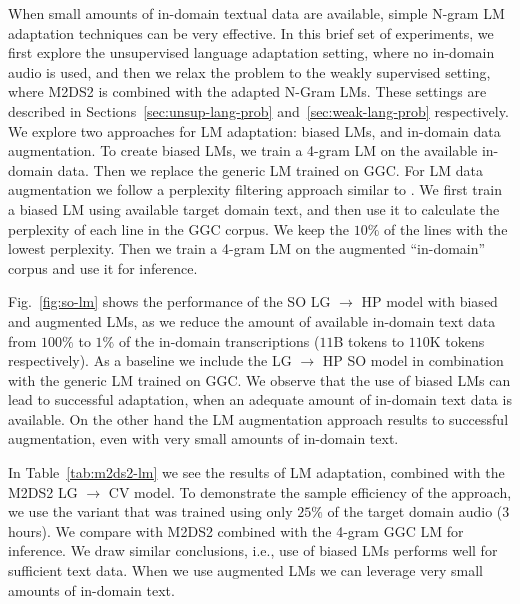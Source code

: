 \documentclass[journal]{IEEEtran}
\begin{document}
When small amounts of in-domain textual data are available, simple N-gram LM adaptation techniques can be very effective. In this brief set of experiments, we first explore the unsupervised language adaptation setting, where no in-domain audio is used, and then we relax the problem to the weakly supervised setting, where M2DS2 is combined with the adapted N-Gram LMs. These settings are described in Sections~\ref{sec:unsup-lang-prob} and~\ref{sec:weak-lang-prob} respectively.
We explore two approaches for LM adaptation: biased LMs, and in-domain data augmentation. To create biased LMs, we train a 4-gram LM on the available in-domain data. Then we replace the generic LM trained on GGC.
For LM data augmentation we follow a perplexity filtering approach similar to \cite{wenzek2020ccnet}. We first train a biased LM using available target domain text, and then use it to calculate the perplexity of each line in the GGC corpus. We keep the $10\%$ of the lines with the lowest perplexity. Then we train a 4-gram LM on the augmented ``in-domain'' corpus and use it for inference.

Fig.~\ref{fig:so-lm} shows the performance of the SO LG $\rightarrow$ HP model with biased and augmented LMs, as we reduce the amount of available in-domain text data from $100\%$ to $1\%$ of the in-domain transcriptions ($11$B tokens to $110$K tokens respectively).
As a baseline we include the LG $\rightarrow$ HP SO model in combination with the generic LM trained on GGC.
We observe that the use of biased LMs can lead to successful adaptation, when an adequate amount of in-domain text data is available. On the other hand the LM augmentation approach results to successful augmentation, even with very small amounts of in-domain text.


In Table~\ref{tab:m2ds2-lm} we see the results of LM adaptation, combined with the M2DS2 LG $\rightarrow$ CV model. To demonstrate the sample efficiency of the approach, we use the variant that was trained using only $25\%$ of the target domain audio ($3$ hours). We compare with M2DS2 combined with the 4-gram GGC LM for inference. We draw similar conclusions, i.e., use of biased LMs performs well for sufficient text data. When we use augmented LMs we can leverage very small amounts of in-domain text.
\end{document}
